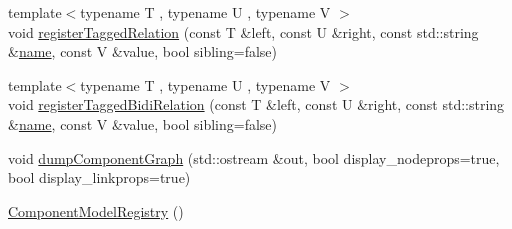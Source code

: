 \begin{DoxyCompactItemize}
\item 
{\footnotesize template$<$typename T , typename U , typename V $>$ }\\void \hyperlink{class_component_model_registry_a28709e521e3e64bbcd349095bee31831}{register\+Tagged\+Relation} (const T \&left, const U \&right, const std\+::string \&\hyperlink{mtconf_8c_a8f8f80d37794cde9472343e4487ba3eb}{name}, const V \&value, bool sibling=false)
\item 
{\footnotesize template$<$typename T , typename U , typename V $>$ }\\void \hyperlink{class_component_model_registry_af7d9529c8de84955e3a856241b843640}{register\+Tagged\+Bidi\+Relation} (const T \&left, const U \&right, const std\+::string \&\hyperlink{mtconf_8c_a8f8f80d37794cde9472343e4487ba3eb}{name}, const V \&value, bool sibling=false)
\item 
void \hyperlink{class_component_model_registry_adb491194c93c8031b35c256136b03802}{dump\+Component\+Graph} (std\+::ostream \&out, bool display\+\_\+nodeprops=true, bool display\+\_\+linkprops=true)
\item 
\hyperlink{class_component_model_registry_a2816959e7e85a75fbd46be4e403f1e3f}{Component\+Model\+Registry} ()
\end{DoxyCompactItemize}
